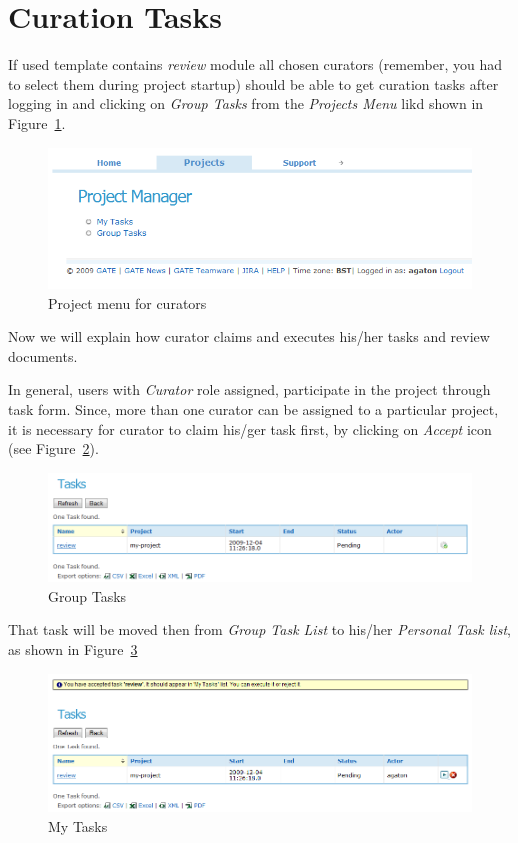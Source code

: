 \section{Curation Tasks}\label{section:curation-tasks}
If used template contains \emph{review} module all chosen curators (remember,
you had to select them during project startup) should be able to get curation
tasks after logging in and clicking on \emph{Group Tasks} from the
\emph{Projects Menu} likd shown in Figure~\ref{fig:curator-home-page}. 
\begin{figure}[htb]
\centering
\includegraphics[scale=0.5]{curator-home-page}
\caption{Project menu for curators}
\label{fig:curator-home-page}
\end{figure}

Now we will explain how curator claims and executes his/her tasks and review
documents.

In general, users with \emph{Curator} role assigned, participate in
the project through task form. Since, more than one curator can be assigned to
a particular project, it is necessary for curator to claim his/ger task first,
by clicking on \emph{Accept} icon (see Figure~\ref{fig:reviewgrouptask}). 

\begin{figure}[htb]
\centering
\includegraphics[scale=0.5]{reviewgrouptask}
\caption{Group Tasks}
\label{fig:reviewgrouptask}
\end{figure}

That task will be moved then from \emph{Group Task List} to his/her
\emph{Personal Task list}, as shown in Figure~\ref{fig:acceptedreviewtask} 

\begin{figure}[htb]
\centering
\includegraphics[scale=0.5]{acceptedreviewtask}
\caption{My Tasks}
\label{fig:acceptedreviewtask}
\end{figure}

